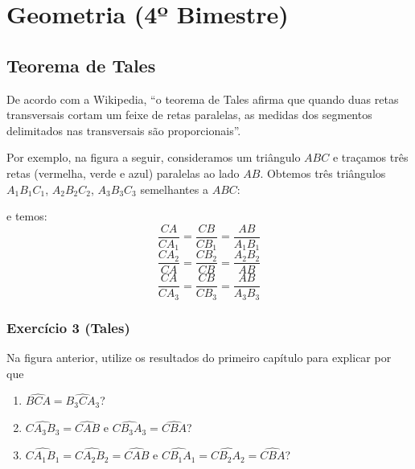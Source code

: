 \chapter{Geometria (4º Bimestre)}

\section{Teorema de Tales}

De acordo com a Wikipedia, ``o teorema de Tales afirma que quando duas retas
transversais cortam um feixe de retas paralelas, as medidas dos segmentos
delimitados nas transversais são proporcionais''.

Por exemplo, na figura a seguir, consideramos um triângulo $ABC$ e traçamos três
retas (vermelha, verde e azul) paralelas ao lado $AB$. Obtemos três triângulos
${A_1B_1C_1}$, ${A_2B_2C_2}$, ${A_3B_3C_3}$ semelhantes a $ABC$:

\begin{center}
\end{center}

e temos:
$$
\frac{CA}{CA_1} = \frac{CB}{CB_1} = \frac{AB}{A_1B_1}
$$
$$
\frac{CA_2}{CA} = \frac{CB_2}{CB} = \frac{A_2B_2}{AB}
$$
$$
\frac{CA}{CA_3} = \frac{CB}{CB_3} = \frac{AB}{A_3B_3}
$$

\subsection*{Exercício 3 (Tales)}

Na figura anterior, utilize os resultados do primeiro capítulo para explicar por
que

\begin{enumerate}
\item $\widehat{BCA} = \widehat{B_3CA_3}$?
\item $\widehat{CA_3B_3} = \widehat{CAB}$ e $\widehat{CB_3A_3} = \widehat{CBA}$?
\item $\widehat{CA_1B_1} = \widehat{CA_2B_2} = \widehat{CAB}$ e
  $\widehat{CB_1A_1} = \widehat{CB_2A_2} = \widehat{CBA}$?
\end{enumerate}

